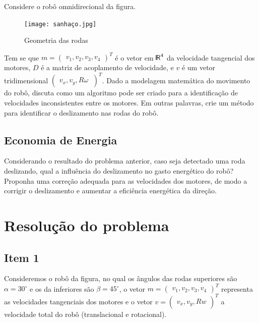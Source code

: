 \documentclass{article}
\def\bkRsf{{\sf \mbox{\vrule height0.705em width0.06em
            depth0em}\kern-.04em R}}
\begin{document}
\hspace{1cm}Considere o robô omnidirecional da figura.

\begin{figure}[H]
\centering
\texttt{[image: sanhaço.jpg]}
\caption{Geometria das rodas}
\label{Figura 1}
\end{figure}

Tem se que $m=\begin{pmatrix}v_{1},v_{2},v_{3},v_{4} \end{pmatrix}^T$ é o vetor em $\bkRsf^4$ da velocidade tangencial dos motores, $D$ é a matriz de acoplamento de velocidade, e $v$  é um vetor tridimensional $\begin{pmatrix}v_{x},v_{y},R{\omega}\ \end{pmatrix}^T$.
Dado a modelagem matemática do movimento do robô, discuta como um algoritmo pode ser criado para a identificação de velocidades inconsistentes entre os motores. Em outras palavras, crie um método para identificar o  deslizamento nas rodas do robô.

\subsection{Economia de Energia}

\hspace{1cm}Considerando o resultado do problema anterior, caso seja detectado uma roda deslizando, qual a influência do deslizamento no gasto energético do robô? Proponha uma correção adequada para as velocidades dos motores, de modo a corrigir o deslizamento e aumentar a eficiência energética da direção.

\section{Resolução do problema}
\subsection{Item 1}

\hspace{1cm}Consideremos o robô da figura, no qual os ângulos das rodas superiores são $\alpha=30^{\circ}$ e os da inferiores são $\beta=45^{\circ}$, o vetor $m = \begin{pmatrix} v_{1},v_{2},v_{3},v_{4} \end{pmatrix}^T$ representa as velocidades tangenciais dos motores e o vetor $v = \begin{pmatrix} v_{x},v_{y},Rw \end{pmatrix}^T$ a velocidade total do robô (translacional e rotacional).
\end{document}
